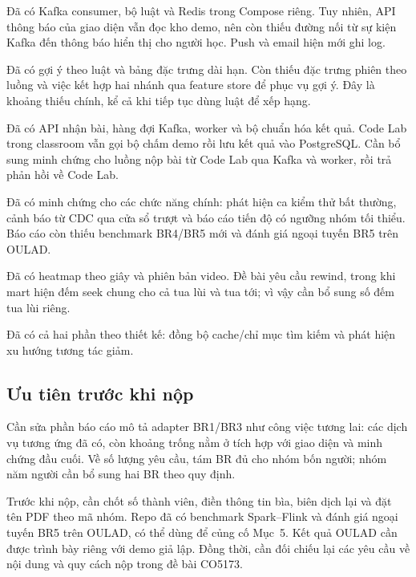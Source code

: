 \begin{description}[leftmargin=2.6cm,labelwidth=2.4cm,style=nextline]
  \item[\br{1} -- Thông báo]
  Đã có Kafka consumer, bộ luật và Redis trong Compose riêng. Tuy nhiên,
  API thông báo của giao diện vẫn đọc kho demo, nên còn thiếu đường nối từ
  sự kiện Kafka đến thông báo hiển thị cho người học. Push và email hiện
  mới ghi log.

  \item[\br{2} -- Gợi ý học tập]
  Đã có gợi ý theo luật và bảng đặc trưng dài hạn. Còn thiếu đặc trưng phiên
  theo luồng và việc kết hợp hai nhánh qua feature store để phục vụ gợi ý.
  Đây là khoảng thiếu chính, kể cả khi tiếp tục dùng luật để xếp hạng.

  \item[\br{3} -- Chấm bài]
  Đã có API nhận bài, hàng đợi Kafka, worker và bộ chuẩn hóa kết quả. Code
  Lab trong classroom vẫn gọi bộ chấm demo rồi lưu kết quả vào PostgreSQL.
  Cần bổ sung minh chứng cho luồng nộp bài từ Code Lab qua Kafka và worker,
  rồi trả phản hồi về Code Lab.

  \item[\br{4}--\br{6}]
  Đã có minh chứng cho các chức năng chính: phát hiện ca kiểm thử bất
  thường, cảnh báo từ CDC qua cửa sổ trượt và báo cáo tiến độ có ngưỡng
  nhóm tối thiểu. Báo cáo còn thiếu benchmark BR4/BR5 mới và đánh giá ngoại
  tuyến BR5 trên OULAD.

  \item[\br{7} -- Heatmap]
  Đã có heatmap theo giây và phiên bản video. Đề bài yêu cầu rewind, trong
  khi mart hiện đếm seek chung cho cả tua lùi và tua tới; vì vậy cần bổ sung
  số đếm tua lùi riêng.

  \item[\br{8} -- Nội dung và tương tác]
  Đã có cả hai phần theo thiết kế: đồng bộ cache/chỉ mục tìm kiếm và phát
  hiện xu hướng tương tác giảm.
\end{description}

\subsection*{Ưu tiên trước khi nộp}

Cần sửa phần báo cáo mô tả adapter BR1/BR3 như công việc tương lai: các dịch
vụ tương ứng đã có, còn khoảng trống nằm ở tích hợp với giao diện và minh
chứng đầu cuối. Về số lượng yêu cầu, tám BR đủ cho nhóm bốn người; nhóm năm
người cần bổ sung hai BR theo quy định.

Trước khi nộp, cần chốt số thành viên, điền thông tin bìa, biên dịch lại và
đặt tên PDF theo mã nhóm. Repo đã có benchmark Spark--Flink và đánh giá
ngoại tuyến BR5 trên OULAD, có thể dùng để củng cố Mục~5. Kết quả OULAD cần được trình bày riêng với
demo giả lập. Đồng thời, cần đối chiếu lại các yêu cầu
về nội dung và quy cách nộp trong đề bài CO5173.